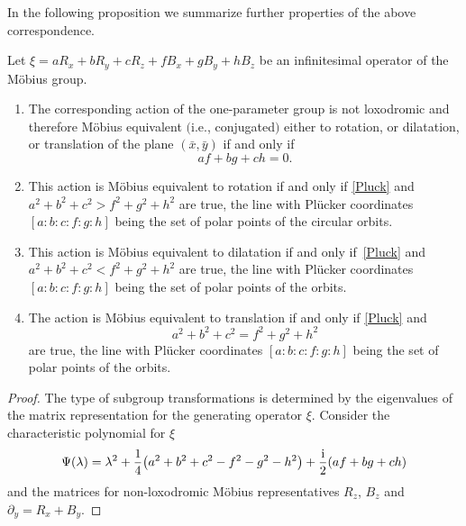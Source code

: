 In the following proposition we summarize further properties of the above correspondence.
\begin{Proposition}\label{operline}
Let $\xi =aR_x+bR_y+cR_z+fB_x+gB_y+hB_z$ be an infinitesimal operator of the M\"obius group.
\begin{enumerate}\itemsep=0pt
\item[$(1)$] The corresponding action of the one-parameter group is not loxodromic and therefore M\"obius equivalent $($i.e., conjugated$)$ either to rotation, or dilatation, or translation of the plane $(\bar{x},\bar{y})$ if and only if \begin{equation}\label{Pluck}
af+bg+ch=0.
\end{equation}
\item[$(2)$] This action is M\"obius equivalent to rotation if and only if \eqref{Pluck} and
$a^2+b^2+c^2>f^2+g^2+h^2$ are true, the line with Pl\"ucker coordinates $[a:b:c:f:g:h]$ being the set of polar points of the circular orbits.
\item[$(3)$] This action is M\"obius equivalent to dilatation if and only if~\eqref{Pluck} and
$a^2+b^2+c^2<f^2+g^2+h^2$ are true, the line with Pl\"ucker coordinates $[a:b:c:f:g:h]$ being the set of polar points of the orbits.
\item[$(4)$] The action is M\"obius equivalent to translation if and only if \eqref{Pluck} and
\begin{equation}\label{quadrcomplex}
a^2+b^2+c^2=f^2+g^2+h^2
\end{equation} are true, the line with Pl\"ucker coordinates $[a:b:c:f:g:h]$ being the set of polar points of the orbits.
\end{enumerate}
\end{Proposition}
\begin{proof}
The type of subgroup transformations is determined by the eigenvalues of the matrix representation for the generating operator $\xi$. Consider the characteristic polynomial for $\xi$
\[
\Psi (\lambda)=\lambda^2 +\frac{1}{4}\bigl( a^2 + b^2 + c^2 - f^2 - g^2 - h^2\bigr)+\frac{\rm i}{2}(af + bg +ch)
\]
and the matrices for non-loxodromic M\"obius representatives $R_z$, $B_z$ and $\partial_y=R_x+B_y$.
\end{proof}

